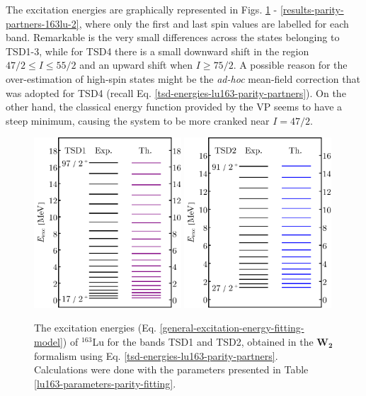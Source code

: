 The excitation energies are graphically represented in Figs. \ref{results-parity-partners-163lu-1} - \ref{results-parity-partners-163lu-2}, where only the first and last spin values are labelled for each band. Remarkable is the very small differences across the states belonging to TSD1-3, while for TSD4 there is a small downward shift in the region $47/2\leq I\leq 55/2$ and an upward shift when $I\geq 75/2$. A possible reason for the over-estimation of high-spin states might be the \emph{ad-hoc} mean-field correction that was adopted for TSD4 (recall Eq. \ref{tsd-energies-lu163-parity-partners}). On the other hand, the classical energy function provided by the VP seems to have a steep minimum, causing the system to be more cranked near $I=47/2$.
\begin{figure}
    \centering
    \includegraphics[width=0.49\textwidth]{Chapters/Figures/parity-partners-plots/tsd1.pdf}
    \includegraphics[width=0.49\textwidth]{Chapters/Figures/parity-partners-plots/tsd2.pdf}
    \caption{The excitation energies (Eq. \ref{general-excitation-energy-fitting-model}) of $^{163}$Lu for the bands TSD1 and TSD2, obtained in the $\mathbf{W_2}$ formalism using Eq. \ref{tsd-energies-lu163-parity-partners}. Calculations were done with the parameters presented in Table \ref{lu163-parameters-parity-fitting}.}
    \label{results-parity-partners-163lu-1}
\end{figure}
